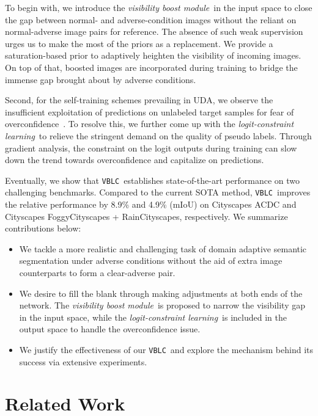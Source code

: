 \documentclass[letterpaper]{article} \usepackage{aaai23}  \usepackage{times}  \usepackage{helvet}  \usepackage{courier}  \usepackage[hyphens]{url}  \usepackage{graphicx} \urlstyle{rm} \def\UrlFont{\rm}  \usepackage{natbib}  \usepackage{caption} \frenchspacing  \setlength{\pdfpagewidth}{8.5in}  \setlength{\pdfpageheight}{11in}  \usepackage{algorithm}
\newcommand{\method}{\texttt{VBLC}~}
\newcommand{\boostModuleName}{\textit{visibility boost module}}
\newcommand{\lossModuleName}{\textit{logit-constraint learning}}
\begin{document}
To begin with, we introduce the \boostModuleName~in the input space to close the gap between normal- and adverse-condition images without the reliant on normal-adverse image pairs for reference. The absence of such weak supervision urges us to make the most of the priors as a replacement. We provide a saturation-based prior to adaptively heighten the visibility of incoming images. On top of that, boosted images are incorporated during training to bridge the immense gap brought about by adverse conditions. 

Second, for the self-training schemes prevailing in UDA, we observe the insufficient exploitation of predictions on unlabeled target samples for fear of overconfidence~\cite{wei2022mitigating}. To resolve this, we further come up with the \lossModuleName~to relieve the stringent demand on the quality of pseudo labels. Through gradient analysis, the constraint on the logit outputs during training can slow down the trend towards overconfidence and capitalize on predictions.  

Eventually, we show that \method establishes state-of-the-art performance on two challenging benchmarks. Compared to the current SOTA method, \method improves the relative performance by 8.9\% and 4.9\% (mIoU) on Cityscapes  ACDC and Cityscapes  FoggyCityscapes + RainCityscapes, respectively. We summarize contributions below:
\begin{itemize}
    \item We tackle a more realistic and challenging task of domain adaptive semantic segmentation under adverse conditions without the aid of extra image counterparts to form a clear-adverse pair.
    \item We desire to fill the blank through making adjustments at both ends of the network. The \boostModuleName~is proposed to narrow the visibility gap in the input space, while the \lossModuleName~is included in the output space to handle the overconfidence issue.
    \item We justify the effectiveness of our \method and explore the mechanism behind its success via extensive experiments.
\end{itemize}

\section{Related Work}\label{sec:related}
\end{document}
